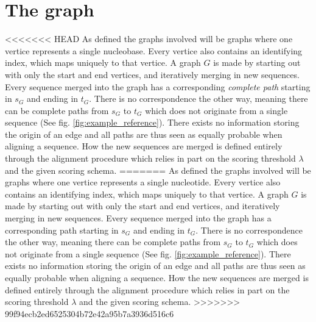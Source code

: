 \documentclass{article}
\begin{document}
\section{The graph}
<<<<<<< HEAD
As defined the graphs involved will be graphs where one vertice represents a single nucleobase. Every vertice also contains an identifying index, which maps uniquely to that vertice.  A graph $G$ is made by starting out with only the start and end vertices, and iteratively merging in new sequences. Every sequence merged into the graph has a corresponding \textit{complete path} starting in $s_G$ and ending in $t_G$. There is no correspondence the other way, meaning there can be complete paths from $s_G$ to $t_G$ which does not originate from a single sequence (See fig. \ref{fig:example_reference}). There exists no information storing the origin of an edge and all paths are thus seen as equally probable when aligning a sequence. How the new sequences are merged is defined entirely through the alignment procedure which relies in part on the scoring threshold $\lambda$ and the given scoring schema.
=======
As defined the graphs involved will be graphs where one vertice represents a single nucleotide. Every vertice also contains an identifying index, which maps uniquely to that vertice. A graph $G$ is made by starting out with only the start and end vertices, and iteratively merging in new sequences. Every sequence merged into the graph has a corresponding path starting in $s_G$ and ending in $t_G$. There is no correspondence the other way, meaning there can be complete paths from $s_G$ to $t_G$ which does not originate from a single sequence (See fig. \ref{fig:example_reference}). There exists no information storing the origin of an edge and all paths are thus seen as equally probable when aligning a sequence. How the new sequences are merged is defined entirely through the alignment procedure which relies in part on the scoring threshold $\lambda$ and the given scoring schema.
>>>>>>> 99f94ecb2ed6525304b72e42a95b7a3936d516c6
\clearpage
\end{document}
